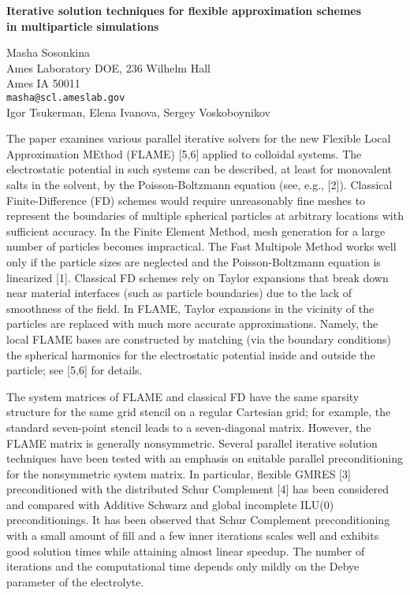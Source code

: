 \documentclass{report}
\begin{document}

\begin{center}
{\large
{\bf Iterative solution techniques for flexible approximation schemes \\
	in multiparticle simulations}}

	Masha Sosonkina \\
	Ames Laboratory DOE, 236 Wilhelm Hall \\
	Ames IA 50011 \\
	{\tt masha@scl.ameslab.gov} \\
	Igor Tsukerman, Elena Ivanova, Sergey Voskoboynikov
\end{center}
The paper examines various parallel iterative solvers
for the new Flexible Local Approximation MEthod (FLAME)
[5,6] applied to colloidal
systems. The electrostatic potential in such  systems
can be described, at least for monovalent salts in the
solvent, by the Poisson-Boltzmann equation
(see, e.g., [2]).
Classical Finite-Difference (FD)
schemes would require unreasonably fine meshes to
represent the boundaries of multiple spherical
particles at arbitrary locations with sufficient
accuracy. In the Finite Element Method, mesh generation
for a large number of particles becomes impractical.
The Fast Multipole Method works well only if the
particle sizes are neglected and the Poisson-Boltzmann
equation is linearized [1].  Classical
FD schemes rely on Taylor expansions that break down
near material interfaces (such as particle boundaries)
due to the lack of smoothness  of the field. In FLAME,
Taylor expansions in the vicinity of the particles  are
replaced with much more accurate approximations.
Namely, the local FLAME bases are constructed by
matching (via the boundary conditions) the spherical
harmonics for the electrostatic potential inside and
outside the particle;
see [5,6] for details.

The system matrices of FLAME and classical FD have the
same sparsity structure for the same grid stencil on a
regular Cartesian grid; for example, the standard
seven-point stencil leads to a seven-diagonal matrix.
However, the FLAME matrix is generally nonsymmetric.
Several parallel iterative solution techniques have
been tested with an emphasis on suitable parallel
preconditioning for the nonsymmetric system matrix. In
particular, flexible GMRES [3]
preconditioned with the distributed Schur Complement
[4] has been considered and
compared with Additive Schwarz and global incomplete
ILU(0) preconditionings.  It has been observed that
Schur Complement preconditioning with a small amount of
fill and a few inner iterations scales well and
exhibits good solution times while attaining almost
linear speedup. The number of iterations and the
computational time depends only mildly on the Debye
parameter of the electrolyte.
\end{document}
